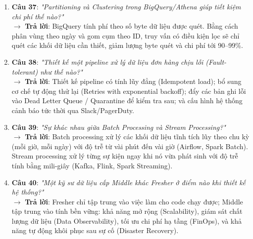 \begin{enumerate}
    $\rightarrow$ \textbf{Trả lời}: SCD Type 1 ghi đè trực tiếp dữ liệu mới lên dữ liệu cũ (mất lịch sử). SCD Type 2 tạo ra một dòng mới với khóa thay thế mới, duy trì lịch sử bằng các cột ngày bắt đầu, ngày kết thúc và cờ hiệu \texttt{is\_current}.
    \item \textbf{Câu 37}: \textit{"Partitioning và Clustering trong BigQuery/Athena giúp tiết kiệm chi phí thế nào?"} \\
    $\rightarrow$ \textbf{Trả lời}: BigQuery tính phí theo số byte dữ liệu được quét. Bằng cách phân vùng theo ngày và gom cụm theo ID, truy vấn có điều kiện lọc sẽ chỉ quét các khối dữ liệu cần thiết, giảm lượng byte quét và chi phí tới 90--99\%.
    \item \textbf{Câu 38}: \textit{"Thiết kế một pipeline xử lý dữ liệu đơn hàng chịu lỗi (Fault-tolerant) như thế nào?"} \\
    $\rightarrow$ \textbf{Trả lời}: Thiết kế pipeline có tính lũy đẳng (Idempotent load); bổ sung cơ chế tự động thử lại (Retries with exponential backoff); đẩy các bản ghi lỗi vào Dead Letter Queue / Quarantine để kiểm tra sau; và cấu hình hệ thống cảnh báo tức thời qua Slack/PagerDuty.
    \item \textbf{Câu 39}: \textit{"Sự khác nhau giữa Batch Processing và Stream Processing?"} \\
    $\rightarrow$ \textbf{Trả lời}: Batch processing xử lý các khối dữ liệu tĩnh tích lũy theo chu kỳ (mỗi giờ, mỗi ngày) với độ trễ từ vài phút đến vài giờ (Airflow, Spark Batch). Stream processing xử lý từng sự kiện ngay khi nó vừa phát sinh với độ trễ tính bằng mili-giây (Kafka, Flink, Spark Streaming).
    \item \textbf{Câu 40}: \textit{"Một kỹ sư dữ liệu cấp Middle khác Fresher ở điểm nào khi thiết kế hệ thống?"} \\
    $\rightarrow$ \textbf{Trả lời}: Fresher chỉ tập trung vào việc làm cho code chạy được; Middle tập trung vào tính bền vững: khả năng mở rộng (Scalability), giám sát chất lượng dữ liệu (Data Observability), tối ưu chi phí hạ tầng (FinOps), và khả năng tự động khôi phục sau sự cố (Disaster Recovery).
\end{enumerate}
